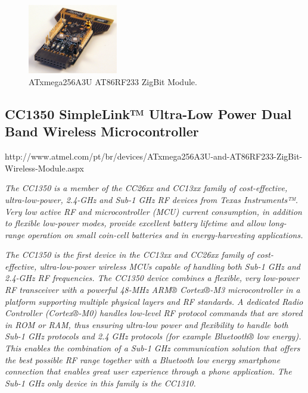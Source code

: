 \begin{figure}[h!]
	\centering
	\includegraphics[width=0.35\textwidth,keepaspectratio]{figures/atxmega}
	\caption{ATxmega256A3U AT86RF233 ZigBit Module.}
	
\end{figure}


\subsection{CC1350 SimpleLink™ Ultra-Low Power Dual Band Wireless Microcontroller}

\begin{framed}
	
	http://www.atmel.com/pt/br/devices/ATxmega256A3U-and-AT86RF233-ZigBit-Wireless-Module.aspx
	
	\vspace{1em}
	\hline
	\vspace{1em}
\small	
	\textit{The CC1350 is a member of the CC26xx and CC13xx family of cost-effective, ultra-low-power, 2.4-GHz and Sub-1 GHz RF devices from Texas Instruments™. Very low active RF and microcontroller (MCU) current consumption, in addition to flexible low-power modes, provide excellent battery lifetime and allow long-range operation on small coin-cell batteries and in energy-harvesting applications.}
		
		\textit{The CC1350 is the first device in the CC13xx and CC26xx family of cost-effective, ultra-low-power wireless MCUs capable of handling both Sub-1 GHz and 2.4-GHz RF frequencies. The CC1350 device combines a flexible, very low-power RF transceiver with a powerful 48-MHz ARM® Cortex®-M3 microcontroller in a platform supporting multiple physical layers and RF standards. A dedicated Radio Controller (Cortex®-M0) handles low-level RF protocol commands that are stored in ROM or RAM, thus ensuring ultra-low power and flexibility to handle both Sub-1 GHz protocols and 2.4 GHz protocols (for example Bluetooth® low energy). This enables the combination of a Sub-1 GHz communication solution that offers the best possible RF range together with a Bluetooth low energy smartphone connection that enables great user experience through a phone application. The Sub-1 GHz only device in this family is the CC1310.}
\end{framed}

